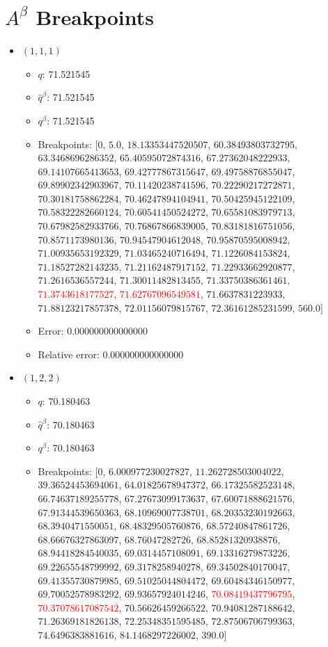 \documentclass{article}%
\begin{document}
\section{$A^\beta$ Breakpoints}%
\thispagestyle{plain}%
\begin{itemize}%
	\item $(1, 1, 1)$%
	\begin{itemize}%
		\item $q$: 71.521545%
		\item $\hat{q}^\beta$: 71.521545%
		\item $q^\beta$: 71.521545%
		\item Breakpoints: $[$$0$, $5.0$, $18.13353447520507$, $60.38493803732795$, $63.3468696286352$, $65.40595072874316$, $67.27362048222933$, $69.14107665413653$, $69.42777867315647$, $69.49758876855047$, $69.89902342903967$, $70.11420238741596$, $70.22290217272871$, $70.30181758862284$, $70.46247894104941$, $70.50425945122109$, $70.58322282660124$, $70.60541450524272$, $70.65581083979713$, $70.67982582933766$, $70.76867866839005$, $70.83181816751056$, $70.8571173980136$, $70.94547904612048$, $70.95870595008942$, $71.00935653192329$, $71.03465240716494$, $71.1226084153824$, $71.18527282143235$, $71.21162487917152$, $71.22933662920877$, $71.2616536557244$, $71.30011482813455$, $71.33750386361461$, \textcolor{red}{$71.3743618177527$}, \textcolor{red}{$71.62767096549581$}, $71.6637831223933$, $71.88123217857378$, $72.01156079815767$, $72.36161285231599$, $560.0$$]$%
		\item Error: 0.000000000000000%
		\item Relative error: 0.000000000000000%
	\end{itemize}%
	\item $(1, 2, 2)$%
	\begin{itemize}%
		\item $q$: 70.180463%
		\item $\hat{q}^\beta$: 70.180463%
		\item $q^\beta$: 70.180463%
		\item Breakpoints: $[$$0$, $6.000977230027827$, $11.262728503004022$, $39.36524453694061$, $64.01825678947372$, $66.17325582523148$, $66.74637189255778$, $67.27673099173637$, $67.60071888621576$, $67.91344539650363$, $68.10969007738701$, $68.20353230192663$, $68.3940471550051$, $68.48329505760876$, $68.57240847861726$, $68.66676327863097$, $68.76047282726$, $68.85281320938876$, $68.94418284540035$, $69.0314457108091$, $69.13316279873226$, $69.22655548799992$, $69.3178258940278$, $69.34502840170047$, $69.41355730879985$, $69.51025044804472$, $69.60484346150977$, $69.70052578983292$, $69.93657924014246$, \textcolor{red}{$70.08419437796795$}, \textcolor{red}{$70.37078617087542$}, $70.56626459266522$, $70.94081287188642$, $71.26369181826138$, $72.25348351595485$, $72.87506706799363$, $74.6496383881616$, $84.1468297226002$, $390.0$$]$%

\end{itemize}
\end{itemize}
\end{document}
